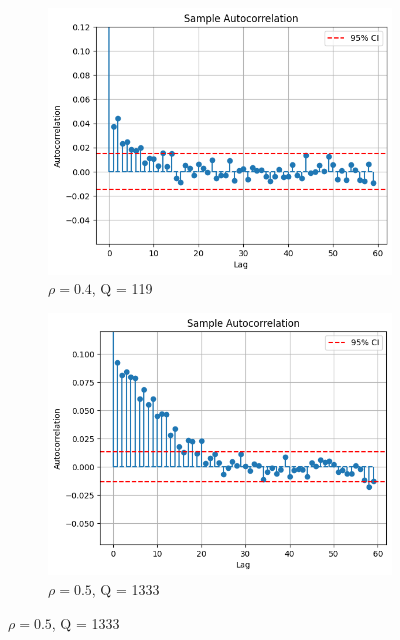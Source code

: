 \begin{figure}[H]
    \captionsetup{type=figure}
    \centering
    \begin{subfigure}[b]{0.45\textwidth}
        \includegraphics[width=\textwidth]{./images/04/autoCor/autoCorLowUnfix.png}
        \caption{$\rho=0.4$, Q = 119}
        \label{fig:autoCorLowUnfix}
    \end{subfigure}
    \hfill %
    \begin{subfigure}[b]{0.45\textwidth}
        \includegraphics[width=\textwidth]{./images/04/autoCor/autoCorHighUnfix.png}
        \caption{$\rho=0.5$, Q = 1333}
        \label{fig:autoCorHighUnfix}
    \end{subfigure}
    \vspace{15pt} %


\end{figure}
